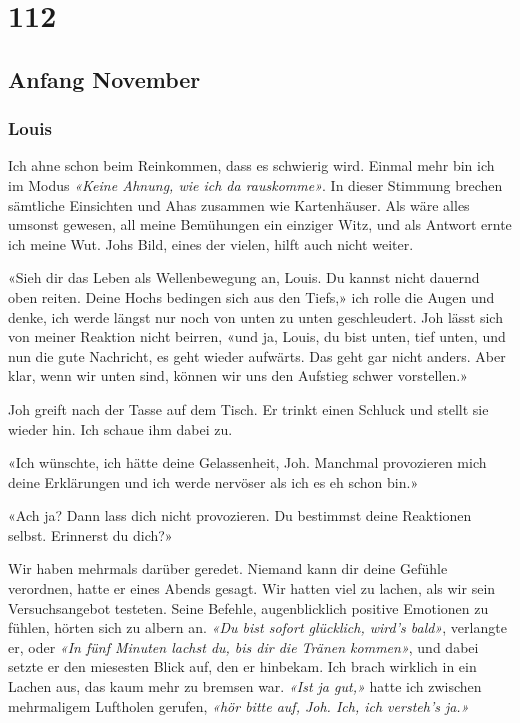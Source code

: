 \chapter{112}

\section{Anfang
November}

\subsection{Louis}

Ich ahne schon beim Reinkommen, dass es schwierig wird.
Einmal mehr bin ich im Modus \emph{«Keine Ahnung, wie ich da
rauskomme»}. In dieser Stimmung brechen sämtliche Einsichten und Ahas
zusammen wie Kartenhäuser. Als wäre alles umsonst gewesen, all meine
Bemühungen ein einziger Witz, und als Antwort ernte ich meine Wut. Johs
Bild, eines der vielen, hilft auch nicht weiter.

«Sieh dir das Leben als Wellenbewegung an, Louis. Du kannst nicht
dauernd oben reiten. Deine Hochs bedingen sich aus den Tiefs,» ich rolle
die Augen und denke, ich werde längst nur noch von unten zu unten
geschleudert. Joh lässt sich von meiner Reaktion nicht beirren, «und ja,
Louis, du bist unten, tief unten, und nun die gute Nachricht, es geht
wieder aufwärts. Das geht gar nicht anders. Aber klar, wenn wir unten
sind, können wir uns den Aufstieg schwer vorstellen.»

Joh greift nach der Tasse auf dem Tisch. Er trinkt einen Schluck und
stellt sie wieder hin. Ich schaue ihm dabei zu.

«Ich wünschte, ich hätte deine Gelassenheit, Joh. Manchmal provozieren
mich deine Erklärungen und ich werde nervöser als ich es eh schon bin.»

«Ach ja? Dann lass dich nicht provozieren. Du bestimmst deine Reaktionen
selbst. Erinnerst du dich?»

Wir haben mehrmals darüber geredet. Niemand kann dir deine Gefühle
verordnen, hatte er eines Abends gesagt. Wir hatten viel zu lachen, als
wir sein Versuchsangebot testeten.
Seine Befehle, augenblicklich positive Emotionen zu fühlen, hörten sich
zu albern an. \emph{«Du bist sofort glücklich, wird’s bald»}, verlangte
er, oder \emph{«In fünf Minuten lachst du, bis dir die Tränen kommen»},
und dabei setzte er den miesesten Blick auf, den er hinbekam. Ich brach
wirklich in ein Lachen aus, das kaum mehr zu bremsen war. \emph{«Ist ja
gut,»} hatte ich zwischen mehrmaligem Luftholen gerufen, \emph{«hör
bitte auf, Joh. Ich, ich versteh’s ja.»}


